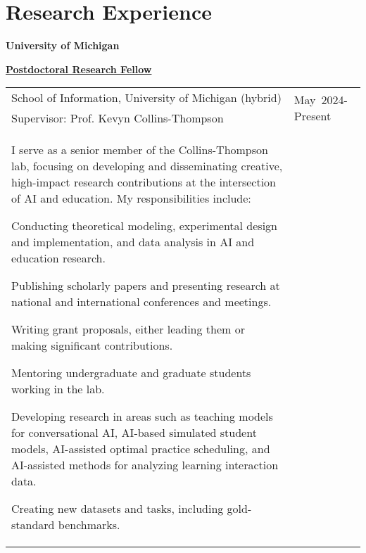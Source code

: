 \documentclass[margin,line]{res}
\newenvironment{list1}{
  \begin{list}{\ding{113}}{%
      \setlength{\itemsep}{0in}
      \setlength{\parsep}{0in} \setlength{\parskip}{0in}
      \setlength{\topsep}{0in} \setlength{\partopsep}{0in}
      \setlength{\leftmargin}{0.17in}}}{\end{list}}
\newenvironment{list3}{
        \begin{list}{\ding{113}}{%
            \setlength{\itemsep}{0in}
            \setlength{\parsep}{0in} \setlength{\parskip}{0in}
            \setlength{\topsep}{0in} \setlength{\partopsep}{0in}
            \setlength{\leftmargin}{0in}
            \setlength{\rightmargin}{1.25in}}}{\end{list}}
\renewcommand{\subsection}[1]{%
      \par\vspace{3pt}%
      \underline{\normalsize\bfseries #1}%
      \par\vspace{3pt}%
    }
\begin{document}
\begin{resume}
\begin{list3}
\end{list3}

\section{\sc Research Experience} 
{\bf University of Michigan}

\subsection{\sc Postdoctoral Research Fellow}
\begin{tabular}{@{}p{4.0in}p{1.0in}}
School of Information, University of Michigan (hybrid) & \multirow{2}{1.0in}{May~2024-Present}\\
Supervisor: Prof. Kevyn Collins-Thompson \\
I serve as a senior member of the Collins-Thompson lab, focusing on developing and disseminating creative, high-impact research contributions at the intersection of AI and education. My responsibilities include:
\begin{list1}
\item Conducting theoretical modeling, experimental design and implementation, and data analysis in AI and education research.
\item Publishing scholarly papers and presenting research at national and international conferences and meetings.
\item Writing grant proposals, either leading them or making significant contributions.
\item Mentoring undergraduate and graduate students working in the lab.
\item Developing research in areas such as teaching models for conversational AI, AI-based simulated student models, AI-assisted optimal practice scheduling, and AI-assisted methods for analyzing learning interaction data.
\item Creating new datasets and tasks, including gold-standard benchmarks.
\end{list1}
\end{tabular}
\newpage

\end{resume}
\end{document}
